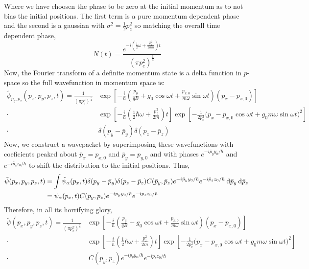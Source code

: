 \documentclass[12pt]{extarticle}
\begin{document}
Where we have choosen the phase to be zero at the initial momentum as to not bias the initial positions. The first term is a pure momentum dependent phase and the second is a gaussian with $\sigma^2 = \frac{1}{2} p_c^2$ so matching the overall time dependent phase, 
\[N(t) = \frac{e^{-i \left(\frac{1}{2} \omega  + \frac{p_z^2}{2\hbar m} \right) t}}{\left(\pi p_c^2 \right)^{\frac{1}{4}}}\]  
Now, the Fourier transform of a definite momentum state is a delta function in $p$-space so the full wavefunction in momentum space is:
\begin{align*}
\tilde{\psi}_{\bar{p}_y, \bar{p}_z} (p_x, p_y, p_z, t) = \frac{1}{\left(\pi p_c^2 \right)^{\frac{1}{4}}} & \exp{\left[-\frac{i}{\hbar} \left(\frac{p_y}{qB} + g_0 \cos{\omega t} + \frac{p_{x, 0}}{m \omega} \sin{\omega t} \right) (p_x - p_{x,0}) \right]} \\ \cdot & \exp{\left[ -\frac{i}{\hbar} \left(\frac{1}{2} \hbar \omega  + \frac{p_z^2}{2 m} \right) t \right]} \exp{\left[ -\frac{1}{2 p_c^2} \Big( p_x - p_{x,0} \cos{\omega t} + g_0 m \omega \sin{\omega t} \Big)^2 \right]} \\ \cdot \: & \delta(p_y - \bar{p}_y) \delta(p_z - \bar{p}_z)
\end{align*}  
Now, we construct a wavepacket by superimposing these wavefunctions with coeficients peaked about $\bar{p}_x = p_{x,0}$ and $\bar{p}_y = p_{y, 0}$ and with phases $e^{-i \bar{p}_y y_0 /\hbar}$ and $e^{-i \bar{p}_z z_0 /\hbar}$ to shift the distribution to the initial positions. Thus,
\begin{align*}
\tilde{\psi} (p_x, p_y, p_z, t) & = \int \tilde{\psi}_\alpha(p_x, t) \delta(p_y - \bar{p}_y) \delta(p_z - \bar{p}_z) C(\bar{p}_y, \bar{p}_z) e^{-i \bar{p}_y y_0 /\hbar} e^{-i \bar{p}_z z_0 /\hbar} \: \mathrm{d}\bar{p}_y \: \mathrm{d}\bar{p}_z \: \\
 & = \psi_\alpha(p_x, t)  C(p_y, p_z) e^{-i p_y y_0 /\hbar} e^{-i p_z z_0 /\hbar}
\end{align*} 
Therefore, in all its horrifying glory,
\begin{align*}
\tilde{\psi} (p_x, p_y, p_z, t) = \frac{1}{\left(\pi p_c^2 \right)^{\frac{1}{4}}} & \exp{\left[-\frac{i}{\hbar} \left(\frac{p_y}{qB} + g_0 \cos{\omega t} + \frac{p_{x, 0}}{m \omega} \sin{\omega t} \right) (p_x - p_{x,0}) \right]} \\ \cdot & \exp{\left[ -\frac{i}{\hbar} \left(\frac{1}{2} \hbar \omega  + \frac{p_z^2}{2 m} \right) t \right]} \exp{\left[ -\frac{1}{2 p_c^2} \Big( p_x - p_{x,0} \cos{\omega t} + g_0 m \omega \sin{\omega t} \Big)^2 \right]} \\ \cdot & \:  C(p_y, p_z) e^{-i p_y y_0 /\hbar} e^{-i p_z z_0 /\hbar}
\end{align*} 
\end{document}
